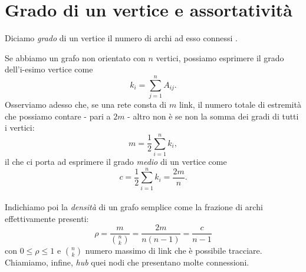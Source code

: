 \section{Grado di un vertice e assortativit\`{a}}
\begin{definizione}
Diciamo \emph{grado} di un vertice il numero di archi ad esso connessi \cite{Lesniak}.
\end{definizione}
Se abbiamo un grafo non orientato con $ n $ vertici, possiamo esprimere il grado dell'i-esimo vertice come
\begin{equation}
	k_i = \sum_{j=1}^n A_{ij}.
\end{equation}
Osserviamo adesso che, se una rete consta di $ m $ link, il numero totale di estremità che possiamo contare - pari a $ 2m $ - altro non è se non la somma dei gradi di tutti i vertici: 
\begin{equation}
	m = \frac{1}{2} \sum_{i=1}^n k_i,
\end{equation}
il che ci porta ad esprimere il grado \emph{medio} di un vertice come 
\begin{equation}
 	c = \frac{1}{2} \sum_{i=1}^n k_i = \frac{2m}{n}. 
\end{equation}
 \\Indichiamo poi la \emph{densità} di un grafo semplice come la frazione di archi effettivamente presenti:
\begin{equation}
	\rho = \frac{m}{\binom{n}{k}} = \frac{2m}{n\left(n-1 \right)} = \frac{c}{n-1}
\end{equation}
con $ 0 \leq \rho \leq  1 $ e  $ \binom{n}{k} $  numero massimo di link che è possibile tracciare. Chiamiamo, infine, \emph{hub} quei nodi che presentano molte connessioni.\\
